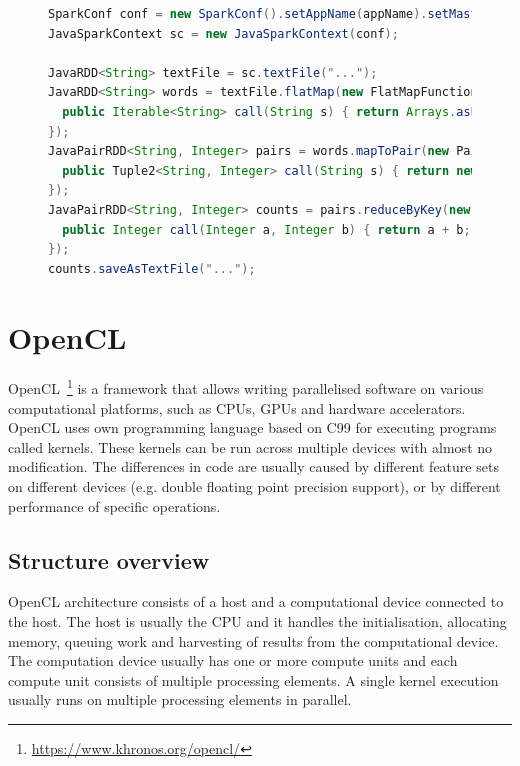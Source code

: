 \documentclass{l4proj}
\begin{document}
\begin{figure}
  \begin{lstlisting}[language=Java]
SparkConf conf = new SparkConf().setAppName(appName).setMaster(master);
JavaSparkContext sc = new JavaSparkContext(conf);

JavaRDD<String> textFile = sc.textFile("...");
JavaRDD<String> words = textFile.flatMap(new FlatMapFunction<String, String>() {
  public Iterable<String> call(String s) { return Arrays.asList(s.split(" ")); }
});
JavaPairRDD<String, Integer> pairs = words.mapToPair(new PairFunction<String, String, Integer>() {
  public Tuple2<String, Integer> call(String s) { return new Tuple2<String, Integer>(s, 1); }
});
JavaPairRDD<String, Integer> counts = pairs.reduceByKey(new Function2<Integer, Integer, Integer>() {
  public Integer call(Integer a, Integer b) { return a + b; }
});
counts.saveAsTextFile("...");
  \end{lstlisting}
\end{figure}

\section{OpenCL}

OpenCL~\footnote{\url{https://www.khronos.org/opencl/}} is a framework that allows
writing parallelised software on various computational platforms, such as CPUs, 
GPUs and hardware accelerators. OpenCL uses own programming language based on C99 for 
executing programs called kernels. These kernels can be run across multiple devices 
with almost no modification. The differences in code are usually caused by different 
feature sets on different devices (e.g. double floating point precision support), or by
different performance of specific operations.

\subsection{Structure overview}

OpenCL architecture consists of a host and a computational device connected to the host.
The host is usually the CPU and it handles the initialisation, allocating memory, queuing work
and harvesting of results from the computational device. The computation device usually has one
or more compute units and each compute unit consists of multiple processing elements. A single kernel
execution usually runs on multiple processing elements in parallel.
\end{document}
